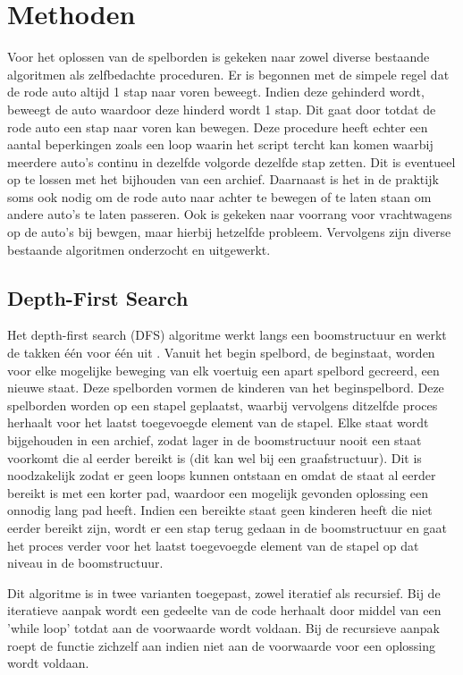 \documentclass[a4paper]{article}
\begin{document}
\section{Methoden}
Voor het oplossen van de spelborden is gekeken naar zowel diverse bestaande algoritmen als zelfbedachte proceduren. Er is begonnen met de simpele regel dat de rode auto altijd 1 stap naar voren beweegt. Indien deze gehinderd wordt, beweegt de auto waardoor deze hinderd wordt 1 stap. Dit gaat door totdat de rode auto een stap naar voren kan bewegen. Deze procedure heeft echter een aantal beperkingen zoals een loop waarin het script tercht kan komen waarbij meerdere auto's continu in dezelfde volgorde dezelfde stap zetten. Dit is eventueel op te lossen met het bijhouden van een archief. Daarnaast is het in de praktijk soms ook nodig om de rode auto naar achter te bewegen of te laten staan om andere auto's te laten passeren. Ook is gekeken naar voorrang voor vrachtwagens op de auto's bij bewgen, maar hierbij hetzelfde probleem. Vervolgens zijn diverse bestaande algoritmen onderzocht en uitgewerkt.

\subsection{Depth-First Search}
Het depth-first search (DFS) algoritme werkt langs een boomstructuur en werkt de takken één voor één uit \cite{tarjan1972depth}. Vanuit het begin spelbord, de beginstaat, worden voor elke mogelijke beweging van elk voertuig een apart spelbord gecreerd, een nieuwe staat. Deze spelborden vormen de kinderen van het beginspelbord. Deze spelborden worden op een stapel geplaatst, waarbij vervolgens ditzelfde proces herhaalt voor het laatst toegevoegde element van de stapel. Elke staat wordt bijgehouden in een archief, zodat lager in de boomstructuur nooit een staat voorkomt die al eerder bereikt is (dit kan wel bij een graafstructuur). Dit is noodzakelijk zodat er geen loops kunnen ontstaan en omdat de staat al eerder bereikt is met een korter pad, waardoor een mogelijk gevonden oplossing een onnodig lang pad heeft. Indien een bereikte staat geen  kinderen heeft die niet eerder bereikt zijn, wordt er een stap terug gedaan in de boomstructuur en gaat het proces verder voor het laatst toegevoegde element van de stapel op dat niveau in de boomstructuur.

	Dit algoritme is in twee varianten toegepast, zowel iteratief als recursief. Bij de iteratieve aanpak wordt een gedeelte van de code herhaalt door middel van een 'while loop' totdat aan de voorwaarde wordt voldaan. Bij de recursieve aanpak roept de functie zichzelf aan indien niet aan de voorwaarde voor een oplossing wordt voldaan. 
    
\end{document}
